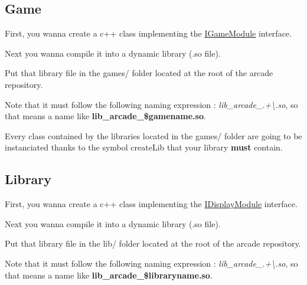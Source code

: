 \subsection*{Game}


\begin{DoxyItemize}
\item First, you wanna create a c++ class implementing the \mbox{\hyperlink{classArcade_1_1Games_1_1IGameModule}{I\+Game\+Module}} interface.
\item Next you wanna compile it into a dynamic library (.so file).
\item Put that library file in the {\ttfamily games/} folder located at the root of the arcade repository.
\begin{DoxyItemize}
\item Note that it must follow the following naming expression \+: {\itshape lib\+\_\+arcade\+\_\+.+\textbackslash{}.so}, so that means a name like {\bfseries{lib\+\_\+arcade\+\_\+\$gamename.\+so}}.
\end{DoxyItemize}
\end{DoxyItemize}

Every class contained by the libraries located in the {\ttfamily games/} folder are going to be instanciated thanks to the symbol {\ttfamily create\+Lib} that your library {\bfseries{must}} contain.


\begin{DoxyCode}{0}
\DoxyCodeLine{\{}
\DoxyCodeLine{\}}
\end{DoxyCode}


\subsection*{Library}


\begin{DoxyItemize}
\item First, you wanna create a c++ class implementing the \mbox{\hyperlink{classArcade_1_1Display_1_1IDisplayModule}{I\+Display\+Module}} interface.
\item Next you wanna compile it into a dynamic library (.so file).
\item Put that library file in the {\ttfamily lib/} folder located at the root of the arcade repository.
\begin{DoxyItemize}
\item Note that it must follow the following naming expression \+: {\itshape lib\+\_\+arcade\+\_\+.+\textbackslash{}.so}, so that means a name like {\bfseries{lib\+\_\+arcade\+\_\+\$libraryname.\+so}}.
\end{DoxyItemize}
\end{DoxyItemize}

